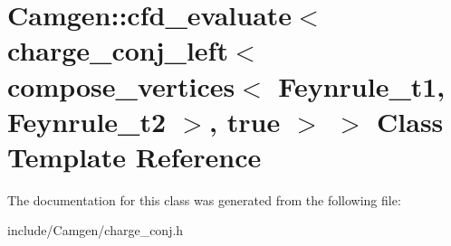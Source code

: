 \hypertarget{a00045}{\section{Camgen\-:\-:cfd\-\_\-evaluate$<$ charge\-\_\-conj\-\_\-left$<$ compose\-\_\-vertices$<$ Feynrule\-\_\-t1, Feynrule\-\_\-t2 $>$, true $>$ $>$ Class Template Reference}
\label{a00045}
}


The documentation for this class was generated from the following file\-:\begin{DoxyCompactItemize}
\item 
include/\-Camgen/charge\-\_\-conj.\-h\end{DoxyCompactItemize}
